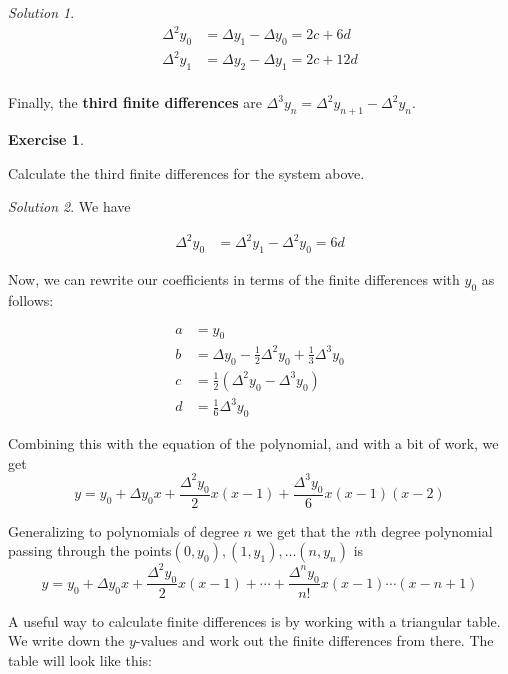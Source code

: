 \documentclass[
]{book}
\theoremstyle{definition}
\theoremstyle{definition}
\theoremstyle{definition}
\newtheorem{exercise}{Exercise}[chapter]
\theoremstyle{definition}
\theoremstyle{remark}
\newtheorem*{solution}{Solution}
\begin{document}
\begin{solution}

\begin{align*}
\Delta^2 y_0 &= \Delta y_1 -\Delta y_0 = 2c+6d \\
\Delta^2 y_1 &= \Delta y_2 -\Delta y_1 = 2c+12d \\
\end{align*}

\end{solution}

Finally, the \textbf{third finite differences} are \(\Delta^3y_n = \Delta^2 y_{n+1}-\Delta^2 y_n\).

\begin{exercise}
\protect\hypertarget{exr:unlabeled-div-142}{}\label{exr:unlabeled-div-142}

Calculate the third finite differences for the system above.

\end{exercise}

\begin{solution}

We have

\begin{align*}
\Delta^2 y_0 &= \Delta^2 y_1 -\Delta^2 y_0 = 6d 
\end{align*}

\end{solution}

Now, we can rewrite our coefficients in terms of the finite differences with \(y_0\) as follows:

\begin{align*}
a &= y_0\\
b &= \Delta y_0 -\frac{1}{2} \Delta^2 y_0 + \frac{1}{3}\Delta^3 y_0\\
c &= \frac{1}{2}(\Delta^2 y_0 - \Delta^3 y_0)\\
d &= \frac{1}{6} \Delta^3 y_0
\end{align*}

Combining this with the equation of the polynomial, and with a bit of work, we get \[y=y_0+ \Delta y_0 x+ \frac{\Delta^2 y_0}{2}x(x-1)+ \frac{\Delta^3 y_0}{6}x(x-1)(x-2)\]

Generalizing to polynomials of degree \(n\) we get that the \(n\)th degree polynomial passing through the points\((0, y_0), (1,y_1),\ldots (n, y_n)\) is \[y= y_0 + \Delta y_0 x + \frac{\Delta^2 y_0}{2}x(x-1)+ \cdots + \frac{\Delta^n y_0}{n!}x(x-1)\cdots(x-n+1)\]

A useful way to calculate finite differences is by working with a triangular table. We write down the \(y\)-values and work out the finite differences from there. The table will look like this:
\end{document}
